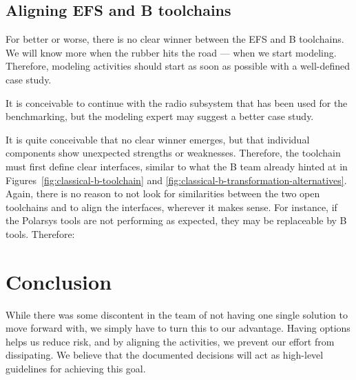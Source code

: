 
\subsection{Aligning EFS and B toolchains}

For better or worse, there is no clear winner between the EFS and B toolchains.  We will know more when the rubber hits the road --- when we start modeling.  Therefore, modeling activities should start as soon as possible with a well-defined case study.


It is conceivable to continue with the radio subsystem that has been used for the benchmarking, but the modeling expert may suggest a better case study.

It is quite conceivable that no clear winner emerges, but that individual components show unexpected strengths or weaknesses.  Therefore, the toolchain must first define clear interfaces, similar to what the B team already hinted at in Figures~\ref{fig:classical-b-toolchain} and \ref{fig:classical-b-transformation-alternatives}.  Again, there is no reason to not look for similarities between the two open toolchains and to align the interfaces, wherever it makes sense.  For instance, if the Polarsys tools are not performing as expected, they may be replaceable by B tools.  Therefore:


\section{Conclusion}

While there was some discontent in the team of not having one single solution to move forward with, we simply have to turn this to our advantage.  Having options helps us reduce risk, and by aligning the activities, we prevent our effort from dissipating.  We believe that the documented decisions will act as high-level guidelines for achieving this goal.



